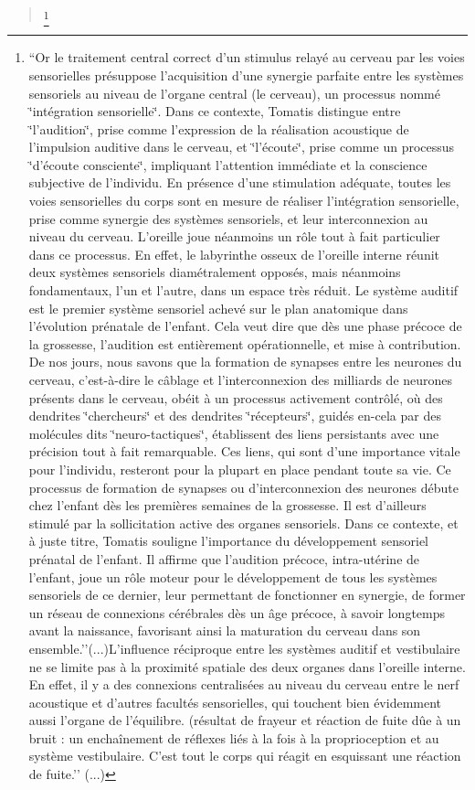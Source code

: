 \begin{quote}
\footnote{``Or le traitement central correct d'un stimulus relayé au cerveau
par les voies sensorielles présuppose l'acquisition d'une synergie
parfaite entre les systèmes sensoriels au niveau de l'organe central
(le cerveau), un processus nommé \char`\"{}intégration sensorielle\char`\"{}.
Dans ce contexte, Tomatis distingue entre \char`\"{}l'audition\char`\"{},
prise comme l'expression de la réalisation acoustique de l'impulsion
auditive dans le cerveau, et \char`\"{}l'écoute\char`\"{}, prise comme
un processus \char`\"{}d'écoute consciente\char`\"{}, impliquant l'attention
immédiate et la conscience subjective de l'individu. En présence d'une
stimulation adéquate, toutes les voies sensorielles du corps sont
en mesure de réaliser l'intégration sensorielle, prise comme synergie
des systèmes sensoriels, et leur interconnexion au niveau du cerveau.
L'oreille joue néanmoins un rôle tout à fait particulier dans ce processus.
En effet, le labyrinthe osseux de l'oreille interne réunit deux systèmes
sensoriels diamétralement opposés, mais néanmoins fondamentaux, l'un
et l'autre, dans un espace très réduit. Le système auditif est le
premier système sensoriel achevé sur le plan anatomique dans l'évolution
prénatale de l'enfant. Cela veut dire que dès une phase précoce de
la grossesse, l'audition est entièrement opérationnelle, et mise à
contribution. De nos jours, nous savons que la formation de synapses
entre les neurones du cerveau, c'est-à-dire le câblage et l'interconnexion
des milliards de neurones présents dans le cerveau, obéit à un processus
activement contrôlé, où des dendrites \char`\"{}chercheurs\char`\"{}
et des dendrites \char`\"{}récepteurs\char`\"{}, guidés en-cela par
des molécules dits \char`\"{}neuro-tactiques\char`\"{}, établissent
des liens persistants avec une précision tout à fait remarquable.
Ces liens, qui sont d'une importance vitale pour l'individu, resteront
pour la plupart en place pendant toute sa vie. Ce processus de formation
de synapses ou d'interconnexion des neurones débute chez l'enfant
dès les premières semaines de la grossesse. Il est d'ailleurs stimulé
par la sollicitation active des organes sensoriels. Dans ce contexte,
et à juste titre, Tomatis souligne l'importance du développement sensoriel
prénatal de l'enfant. Il affirme que l'audition précoce, intra-utérine
de l'enfant, joue un rôle moteur pour le développement de tous les
systèmes sensoriels de ce dernier, leur permettant de fonctionner
en synergie, de former un réseau de connexions cérébrales dès un âge
précoce, à savoir longtemps avant la naissance, favorisant ainsi la
maturation du cerveau dans son ensemble.''(...)L'influence réciproque
entre les systèmes auditif et vestibulaire ne se limite pas à la proximité
spatiale des deux organes dans l'oreille interne. En effet, il y a
des connexions centralisées au niveau du cerveau entre le nerf acoustique
et d'autres facultés sensorielles, qui touchent bien évidemment aussi
l'organe de l'équilibre. (résultat de frayeur et réaction de fuite
dûe à un bruit : un enchaînement de réflexes liés à la fois à la proprioception
et au système vestibulaire. C'est tout le corps qui réagit en esquissant
une réaction de fuite.'' (...)}
\end{quote}
